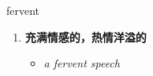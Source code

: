 
\begin{frame}
{\huge fervent}
\begin{center}
\begin{enumerate}\Large
  \item \textbf{充满情感的，热情洋溢的}
  \begin{itemize}
    \item \em{\Large{a fervent speech}}
  \end{itemize}
\end{enumerate}
\end{center}
\end{frame}
